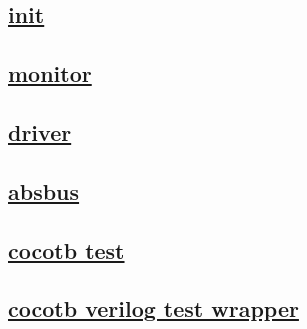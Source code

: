 \documentclass{article}
\begin{document}
  


  \subsection{\href{../files/__init__-py.html}{init}}
  \subsection{\href{../files/monitor-py.html}{monitor}}
  \subsection{\href{../files/driver-py.html}{driver}}
  \subsection{\href{../files/absbus-py.html}{absbus}}
  \subsection{\href{../files2/test-py.html}{cocotb test}}
  \subsection{\href{../files2/test-v.html}{cocotb verilog test wrapper}}
\end{document}
